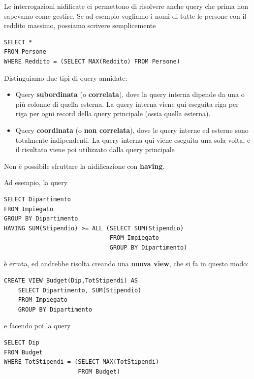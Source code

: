 \documentclass[11pt, a4paper, titlepage, oneside]{scrbook}
\begin{document}
Le interrogazioni nidificate ci permettono di risolvere anche query che prima non sapevamo come gestire. Se ad esempio vogliamo i nomi di tutte le persone con il reddito massimo, possiamo scrivere semplicemente

\begin{lstlisting}
SELECT *
FROM Persone
WHERE Reddito = (SELECT MAX(Reddito) FROM Persone) 
\end{lstlisting}

\begin{Proprieta}
\label{prop-tipi-query-annidate}
Distinguiamo due tipi di query annidate:
\begin{itemize}
    \item Query \textbf{subordinata} (o \textbf{correlata}), dove la query interna dipende da una o più colonne di quella esterna. La query interna viene qui eseguita riga per riga per ogni record della query principale (ossia quella esterna).
    \item Query \textbf{coordinata} (o \textbf{non correlata}), dove le query interne ed esterne sono totalmente indipendenti. La query interna qui viene eseguita una sola volta, e il risultato viene poi utilizzato dalla query principale
\end{itemize}
\end{Proprieta}

\begin{Proposizione}[]
\label{propos-nidificazione}
Non è possibile sfruttare la nidificazione con \textbf{having}.
\end{Proposizione}

Ad esempio, la query

\begin{lstlisting}
SELECT Dipartimento
FROM Impiegato
GROUP BY Dipartimento
HAVING SUM(Stipendio) >= ALL (SELECT SUM(Stipendio)
                              FROM Impiegato
                              GROUP BY Dipartimento) 
\end{lstlisting}

è errata, ed andrebbe risolta creando una \textbf{nuova view}, che si fa in questo modo:

\begin{lstlisting}
CREATE VIEW Budget(Dip,TotStipendi) AS 
    SELECT Dipartimento, SUM(Stipendio)
    FROM Impiegato
    GROUP BY Dipartimento
\end{lstlisting}

e facendo poi la query

\begin{lstlisting}
SELECT Dip
FROM Budget
WHERE TotStipendi = (SELECT MAX(TotStipendi)
                     FROM Budget)
\end{lstlisting}        
\end{document}
